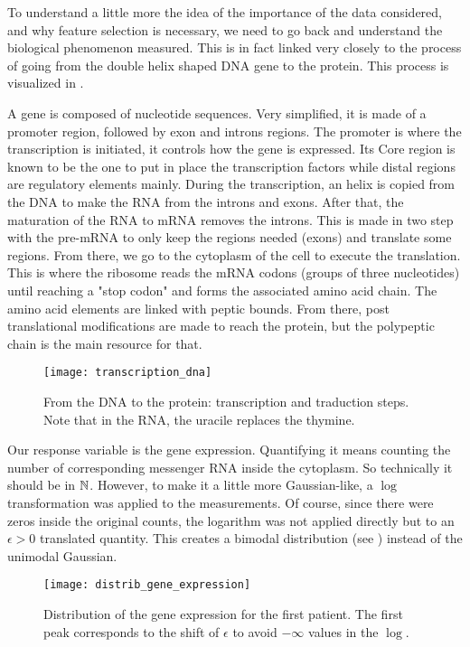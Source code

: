 \documentclass[../main.tex]{subfiles}
\begin{document}
To understand a little more the idea of the importance of the data considered,
and why feature selection is necessary, we need to go back and understand the biological phenomenon measured.
This is in fact linked very closely to the process of going from the double helix shaped DNA gene to the protein.
This process is visualized in .

\medskip

A gene is composed of nucleotide sequences.
Very simplified, it is made of a promoter region, followed by exon and introns regions.
The promoter is where the transcription is initiated, it controls how the gene is expressed.
Its Core region is known to be the one to put in place the transcription factors
while distal regions are regulatory elements mainly.
During the transcription, an helix is copied from the DNA to make the RNA from the introns and exons.
After that, the maturation of the RNA to mRNA removes the introns.
This is made in two step with the pre-mRNA to only keep the regions needed (exons) and translate some regions.
From there, we go to the cytoplasm of the cell to execute the translation.
This is where the ribosome reads the mRNA codons (groups of three nucleotides)
until reaching a "stop codon" and forms the associated amino acid chain.
The amino acid elements are linked with peptic bounds.
From there, post translational modifications are made to reach the protein,
but the polypeptic chain is the main resource for that.

\medskip
\begin{figure}[h]
    \centering
    \texttt{[image: transcription\_dna]}
    \caption{From the DNA to the protein: transcription and traduction steps. Note that in the RNA, the uracile replaces the thymine.}
    \label{fig:dna}
\end{figure}

Our response variable is the gene expression.
Quantifying it means counting the number of corresponding messenger RNA inside
the cytoplasm.
So technically it should be in $\mathbb{N}$.
However, to make it a little more Gaussian-like, a $\log$ transformation was
applied to the measurements.
Of course, since there were zeros inside the original counts,
the logarithm was not applied directly but to an $\epsilon>0$ translated quantity.
This creates a bimodal distribution (see ) instead
of the unimodal Gaussian.

\begin{figure}[h]
    \centering
    \texttt{[image: distrib\_gene\_expression]}
    \caption{Distribution of the gene expression for the first patient. The first peak corresponds to the shift of $\epsilon$ to avoid $-\infty$ values in the $\log$.}
    \label{fig:almost_gaussian}
\end{figure}
\end{document}
